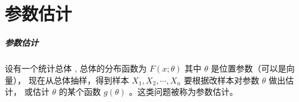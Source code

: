 \chapter{参数估计}

\paragraph*{参数估计} 设有一个统计总体 ,  总体的分布函数为 $ F(x;\theta) $ 其中 $ \theta $ 是位置参数（可以是向量），
现在从总体抽样，得到样本 $ X_1, X_2, \cdots, X_n $ 要根据改样本对参数 $ \theta $ 做出估计，
或估计 $ \theta $ 的某个函数 $ g(\theta) $ 。这类问题被称为参数估计。


